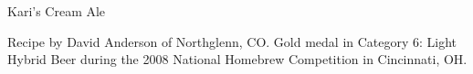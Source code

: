 \begin{recipe}{Kari's Cream Ale} %

\begin{aboutblock}
Recipe by David Anderson of Northglenn, CO. Gold medal in Category 6: Light
Hybrid Beer during the 2008 National Homebrew Competition in Cincinnati, OH.
\sourceaha
\end{aboutblock}


\begin{methodandtiming}

\begin{mashsteps}
\end{mashsteps}

\begin{fermentationsteps}
\end{fermentationsteps}

\end{methodandtiming}

\recipebreak

\begin{ingredientsblock}

\begin{malts}
\end{malts}

\begin{hops}
\end{hops}


\end{ingredientsblock}

\end{recipe}

